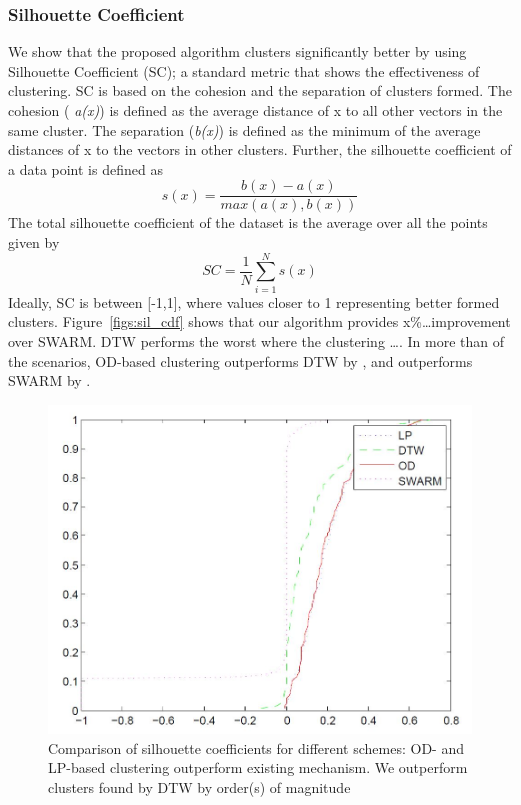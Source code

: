 \subsubsection{Silhouette Coefficient}
We show that the proposed algorithm clusters significantly better by using Silhouette Coefficient (SC); a standard metric that shows the effectiveness of clustering. SC is based on the cohesion and the separation of clusters formed. The cohesion ( \textit{a(x)})  is defined as the average distance of x to all other vectors in the same cluster. 
The separation (\textit{b(x)}) is defined as the minimum of the average distances of x to the vectors in other clusters.
Further, the silhouette coefficient of a data point is defined as 
\begin{equation}
s(x)=\frac{b(x)-a(x)}{max(a(x),b(x))}
\end{equation}
The total silhouette coefficient of the dataset is the average over all the points given by
\begin{equation}
SC=\frac{1}{N}\sum_{i=1}^{N}s(x)
\end{equation}
\noindent Ideally, SC is between [-1,1], where values closer to 1 representing better formed clusters. 
Figure~\ref{figs:sil_cdf} shows that our algorithm provides x\%\ldots improvement over SWARM. DTW performs the worst where the clustering \ldots. In more than  of the scenarios, OD-based clustering outperforms DTW by , and outperforms SWARM by .

\begin{figure}
\centering     
\includegraphics[scale=0.3]{figs/sil_cdf.jpg}
\caption{Comparison of silhouette coefficients for different schemes: OD- and LP-based clustering outperform existing mechanism. We outperform clusters found by DTW by order(s) of magnitude}
\label{fig:sil_cdf}  
\end{figure}

